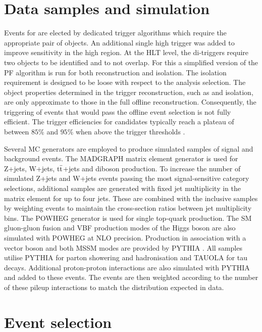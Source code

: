 \section{Data samples and simulation}
\label{sec:analysis_samples}

Events for are elected by dedicated trigger algorithms which require the appropriate pair of \tauh objects. An additional single high \pt \tauh trigger was added to improve sensitivity in the high \pt region. At the HLT level, the di-\tauh triggers require two \tauh objects to be identified and to not overlap. For this a simplified version of the PF algorithm is run for both \tauh reconstruction and isolation. The isolation requirement is designed to be loose with respect to the analysis selection. The object properties determined in the trigger reconstruction, such as \pt and isolation, are only approximate to those in the full offline reconstruction. Consequently, the triggering of events that would pass the offline event selection is not fully efficient. The trigger efficiencies for \tauh candidates typically reach a plateau of between $85\%$ and $95\%$ when above the trigger \pt thresholds \cite{Sirunyan_2018}.

Several MC generators are employed to produce simulated samples of signal and background events. The MADGRAPH \cite{Alwall2011} matrix element generator is used for Z+jets, W+jets, $\mathrm{t\Bar{t}}$+jets and diboson production. To increase the number of simulated Z+jets and W+jets events passing the most signal-sensitive category selections, additional samples are generated with fixed jet multiplicity in the matrix element for up to four jets. These are combined with the inclusive samples by weighting events to maintain the cross-section ratios between jet multiplicity bins. The POWHEG \cite{Alioli2010} generator is used for single top-quark production. The SM gluon-gluon fusion and VBF production modes of the Higgs boson are also simulated with POWHEG at NLO precision. Production in association with a vector boson and both MSSM modes are provided by PYTHIA \cite{SJOSTRAND2008852}. All samples utilise PYTHIA for parton showering and hadronisation and TAUOLA \cite{JADACH1991275} for tau decays. Additional proton-proton interactions are also simulated with PYTHIA and added to these events. The events are then weighted according to the number of these pileup interactions to match the distribution expected in data.

\section{Event selection}
\label{sec:analysis_eventsel}


